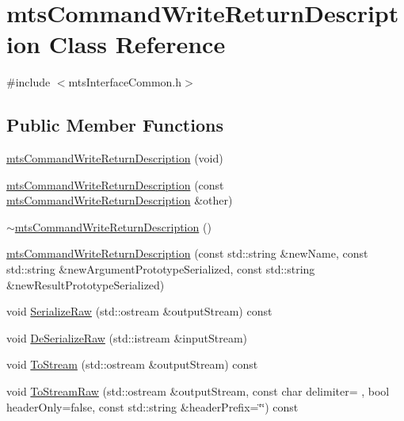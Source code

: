 \hypertarget{classmts_command_write_return_description}{}\section{mts\+Command\+Write\+Return\+Description Class Reference}
\label{classmts_command_write_return_description}


{\ttfamily \#include $<$mts\+Interface\+Common.\+h$>$}

\subsection*{Public Member Functions}
\begin{DoxyCompactItemize}
\item 
\hyperlink{classmts_command_write_return_description_a61ecbd0e18dd8d82e84979b79381f051}{mts\+Command\+Write\+Return\+Description} (void)
\item 
\hyperlink{classmts_command_write_return_description_a30017af79f80cdf7e07b3e62700ebd05}{mts\+Command\+Write\+Return\+Description} (const \hyperlink{classmts_command_write_return_description}{mts\+Command\+Write\+Return\+Description} \&other)
\item 
\hyperlink{classmts_command_write_return_description_a386f923ae97f4929875f00952f666ff3}{$\sim$mts\+Command\+Write\+Return\+Description} ()
\item 
\hyperlink{classmts_command_write_return_description_a1579d40a25060142a0096af6fc6f8a05}{mts\+Command\+Write\+Return\+Description} (const std\+::string \&new\+Name, const std\+::string \&new\+Argument\+Prototype\+Serialized, const std\+::string \&new\+Result\+Prototype\+Serialized)
\item 
void \hyperlink{classmts_command_write_return_description_aa952a713a7b789c1c620f156765c4971}{Serialize\+Raw} (std\+::ostream \&output\+Stream) const 
\item 
void \hyperlink{classmts_command_write_return_description_a1a2afb9f95b96cb806fc3fd90466241f}{De\+Serialize\+Raw} (std\+::istream \&input\+Stream)
\item 
void \hyperlink{classmts_command_write_return_description_abe654d2466493cf4ac7e48956d0bde46}{To\+Stream} (std\+::ostream \&output\+Stream) const 
\item 
void \hyperlink{classmts_command_write_return_description_a362d3c984d6d8d2939c4b96e77cf36a0}{To\+Stream\+Raw} (std\+::ostream \&output\+Stream, const char delimiter= \textquotesingle{} \textquotesingle{}, bool header\+Only=false, const std\+::string \&header\+Prefix=\char`\"{}\char`\"{}) const 

\end{DoxyCompactItemize}
